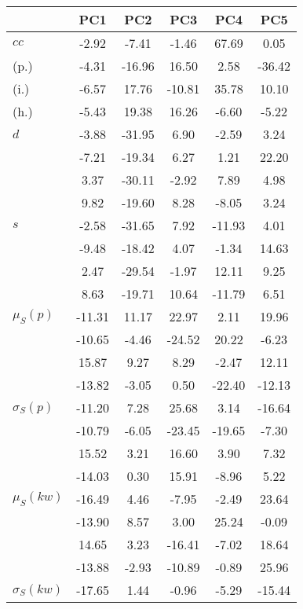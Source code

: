 \begin{table}[h!]
\begin{center}
\begin{tabular}{| l | c | c | c | c | c |}\hline
 & PC1 & PC2 & PC3 & PC4 & PC5 \\\hline
$cc$ & -2.92  & -7.41  & -1.46  & 67.69  & 0.05 \\\hline
(p.) & -4.31  & -16.96  & 16.50  & 2.58  & -36.42 \\\hline
(i.) & -6.57  & 17.76  & -10.81  & 35.78  & 10.10 \\\hline
(h.) & -5.43  & 19.38  & 16.26  & -6.60  & -5.22 \\\hline
$d$ & -3.88  & -31.95  & 6.90  & -2.59  & 3.24 \\\hline
 & -7.21  & -19.34  & 6.27  & 1.21  & 22.20 \\\hline
 & 3.37  & -30.11  & -2.92  & 7.89  & 4.98 \\\hline
 & 9.82  & -19.60  & 8.28  & -8.05  & 3.24 \\\hline
$s$ & -2.58  & -31.65  & 7.92  & -11.93  & 4.01 \\\hline
 & -9.48  & -18.42  & 4.07  & -1.34  & 14.63 \\\hline
 & 2.47  & -29.54  & -1.97  & 12.11  & 9.25 \\\hline
 & 8.63  & -19.71  & 10.64  & -11.79  & 6.51 \\\hline
$\mu_S(p)$ & -11.31  & 11.17  & 22.97  & 2.11  & 19.96 \\\hline
 & -10.65  & -4.46  & -24.52  & 20.22  & -6.23 \\\hline
 & 15.87  & 9.27  & 8.29  & -2.47  & 12.11 \\\hline
 & -13.82  & -3.05  & 0.50  & -22.40  & -12.13 \\\hline
$\sigma_S(p)$ & -11.20  & 7.28  & 25.68  & 3.14  & -16.64 \\\hline
 & -10.79  & -6.05  & -23.45  & -19.65  & -7.30 \\\hline
 & 15.52  & 3.21  & 16.60  & 3.90  & 7.32 \\\hline
 & -14.03  & 0.30  & 15.91  & -8.96  & 5.22 \\\hline
$\mu_S(kw)$ & -16.49  & 4.46  & -7.95  & -2.49  & 23.64 \\\hline
 & -13.90  & 8.57  & 3.00  & 25.24  & -0.09 \\\hline
 & 14.65  & 3.23  & -16.41  & -7.02  & 18.64 \\\hline
 & -13.88  & -2.93  & -10.89  & -0.89  & 25.96 \\\hline
$\sigma_S(kw)$ & -17.65  & 1.44  & -0.96  & -5.29  & -15.44 \\\hline

\end{tabular}
\end{center}
\end{table}
